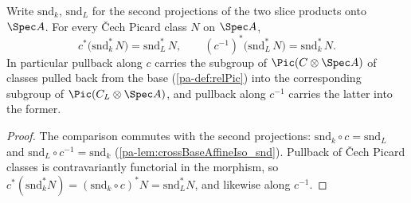 \begin{lemma}
  \label{pa-lem:picFromBase_crossBaseAffineIso}
  \leanok

  Write \(\mathrm{snd}_k\), \(\mathrm{snd}_L\) for the second projections of the two
  slice products onto \(\Spec A\). For every \v Cech Picard class \(N\) on \(\Spec A\),
  \[
    c^{*}\bigl(\mathrm{snd}_k^{*}\, N\bigr) = \mathrm{snd}_L^{*}\, N,
    \qquad
    (c^{-1})^{*}\bigl(\mathrm{snd}_L^{*}\, N\bigr) = \mathrm{snd}_k^{*}\, N .
  \]
  In particular pullback along \(c\) carries the subgroup of
  \(\Pic(C \otimes \Spec A)\) of classes pulled back from the base (\ref{pa-def:relPic})
  into the corresponding subgroup of \(\Pic(C_L \otimes \Spec A)\), and pullback along
  \(c^{-1}\) carries the latter into the former.
\end{lemma}
\begin{proof}
  \leanok
  The comparison commutes with the second projections:
  \(\mathrm{snd}_k \circ c = \mathrm{snd}_L\) and
  \(\mathrm{snd}_L \circ c^{-1} = \mathrm{snd}_k\)
  (\ref{pa-lem:crossBaseAffineIso_snd}). Pullback of \v Cech Picard classes is
  contravariantly functorial in the morphism, so
  \(c^{*}(\mathrm{snd}_k^{*} N) = (\mathrm{snd}_k \circ c)^{*} N =
  \mathrm{snd}_L^{*} N\), and likewise along \(c^{-1}\).
\end{proof}

